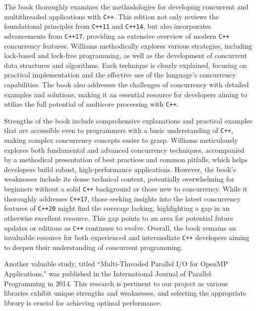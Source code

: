 The book\cite{c++_concurrency_in_action} thoroughly examines the methodologies for developing concurrent and multithreaded applications with \texttt{C++}. This edition not only reviews the foundational principles from \texttt{C++11} and \texttt{C++14}, but also incorporates advancements from \texttt{C++17}, providing an extensive overview of modern \texttt{C++} concurrency features. Williams methodically explores various strategies, including lock-based and lock-free programming, as well as the development of concurrent data structures and algorithms. Each technique is clearly explained, focusing on practical implementation and the effective use of the language's concurrency capabilities. The book also addresses the challenges of concurrency with detailed examples and solutions, making it an essential resource for developers aiming to utilize the full potential of multicore processing with \texttt{C++}.

Strengths of the book\cite{c++_books_stackoverflow} include comprehensive explanations and practical examples that are accessible even to programmers with a basic understanding of \texttt{C++}, making complex concurrency concepts easier to grasp. Williams meticulously explores both fundamental and advanced concurrency techniques, accompanied by a methodical presentation of best practices and common pitfalls, which helps developers build robust, high-performance applications. However, the book's weaknesses include its dense technical content, potentially overwhelming for beginners without a solid \texttt{C++} background or those new to concurrency. While it thoroughly addresses \texttt{C++17}, those seeking insights into the latest concurrency features of \texttt{C++20} might find the coverage lacking, highlighting a gap in an otherwise excellent resource. This gap points to an area for potential future updates or editions as \texttt{C++} continues to evolve. Overall, the book remains an invaluable resource for both experienced and intermediate \texttt{C++} developers aiming to deepen their understanding of concurrent programming.

Another valuable study, titled ``Multi-Threaded Parallel I/O for OpenMP Applications," was published in the International Journal of Parallel Programming in 2014\cite{openmp_usage_hpc}. This research is pertinent to our project as various libraries exhibit unique strengths and weaknesses, and selecting the appropriate library is crucial for achieving optimal performance.

